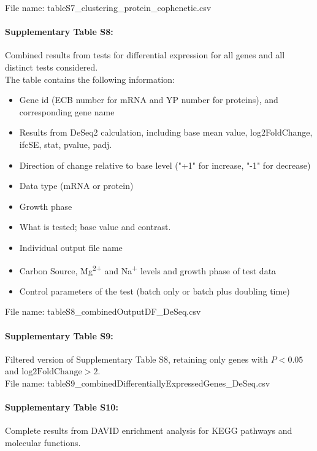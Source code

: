 \documentclass[a4paper]{article}
\begin{document}
\noindent File name: tableS7\_clustering\_protein\_cophenetic.csv

\paragraph*{Supplementary Table S8:} Combined results from tests for differential expression for all genes and all distinct tests considered.\\
 
\noindent The table contains the following information:
\begin{itemize}
\item Gene id (ECB number for mRNA and YP number for proteins), and corresponding gene name
\item Results from DeSeq2 calculation, including base mean value, log2FoldChange, ifcSE, stat, pvalue, padj.
\item Direction of change relative to base level ("+1" for increase, "-1" for decrease)
\item Data type (mRNA or protein)
\item Growth phase
\item What is tested; base value and contrast.
\item Individual output file name 
\item Carbon Source, Mg\textsuperscript{2+} and Na\textsuperscript{+} levels and growth phase of test data 
\item Control parameters of the test (batch only or batch plus doubling time)
\end{itemize}

\noindent File name: tableS8\_combinedOutputDF\_DeSeq.csv


\paragraph*{Supplementary Table S9:} Filtered version of Supplementary Table S8, retaining only genes  with $P<0.05$ and $\text{log2FoldChange}>2$.\\

\noindent File name: tableS9\_combinedDifferentiallyExpressedGenes\_DeSeq.csv

\paragraph*{Supplementary Table S10:} Complete results from DAVID enrichment analysis for KEGG pathways and molecular functions.\\
\end{document}
